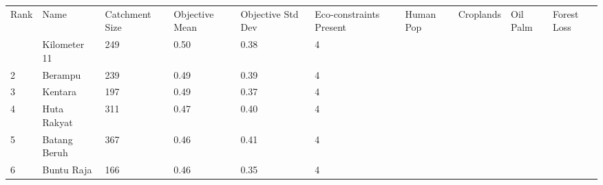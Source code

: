 \begin{table}[ht]
\centering
\begingroup\fontsize{8pt}{9pt}\selectfont
\begin{tabular}{C{0.03\textwidth}C{0.12\textwidth}C{0.09\textwidth}C{0.08\textwidth}C{0.08\textwidth}C{0.08\textwidth}C{0.07\textwidth}C{0.07\textwidth}C{0.07\textwidth}C{0.07\textwidth}}
 Rank & Name & Catchment Size & Objective Mean & Objective Std Dev & Eco-constraints  Present & Human Pop & Croplands & Oil Palm & Forest Loss \\ 
  & Kilometer 11 & 249 & \textcolor[HTML]{FFFFFF}{0.50} & \textcolor[HTML]{FFFFFF}{0.38} & \textcolor[HTML]{000000}{4} &  &  &  &  \\ 
  {2} & Berampu & 239 & \textcolor[HTML]{FFFFFF}{0.49} & \textcolor[HTML]{FFFFFF}{0.39} & \textcolor[HTML]{000000}{4} &  &  &  &  \\ 
  {3} & Kentara & 197 & \textcolor[HTML]{FFFFFF}{0.49} & \textcolor[HTML]{FFFFFF}{0.37} & \textcolor[HTML]{000000}{4} &  &  &  &  \\ 
  {4} & Huta Rakyat & 311 & \textcolor[HTML]{FFFFFF}{0.47} & \textcolor[HTML]{FFFFFF}{0.40} & \textcolor[HTML]{000000}{4} &  &  &  &  \\ 
  {5} & Batang Beruh & 367 & \textcolor[HTML]{000000}{0.46} & \textcolor[HTML]{FFFFFF}{0.41} & \textcolor[HTML]{000000}{4} &  &  &  &  \\ 
  {6} & Buntu Raja & 166 & \textcolor[HTML]{000000}{0.46} & \textcolor[HTML]{000000}{0.35} & \textcolor[HTML]{000000}{4} &  &  &  &  \\ 

\end{tabular}
\end{table}
